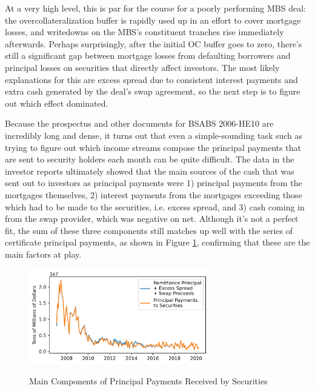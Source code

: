 \documentclass[12pt]{article}
\begin{document}
At a very high level, this is par for the course for a poorly performing MBS deal: the overcollateralization buffer is rapidly used up in an effort to cover mortgage losses, and writedowns on the MBS’s constituent tranches rise immediately afterwards. Perhaps surprisingly, after the initial OC buffer goes to zero, there’s still a significant gap between mortgage losses from defaulting borrowers and principal losses on securities that directly affect investors. The most likely explanations for this are excess spread due to consistent interest payments and extra cash generated by the deal’s swap agreement, so the next step is to figure out which effect dominated.

	Because the prospectus and other documents for BSABS 2006-HE10 are incredibly long and dense, it turns out that even a simple-sounding task such as trying to figure out which income streams compose the principal payments that are sent to security holders each month can be quite difficult. The data in the investor reports ultimately showed that the main sources of the cash that was sent out to investors as principal payments were 1) principal payments from the mortgages themselves, 2) interest payments from the mortgages exceeding those which had to be made to the securities, i.e. excess spread, and 3) cash coming in from the swap provider, which was negative on net. Although it’s not a perfect fit, the sum of these three components still matches up well with the series of certificate principal payments, as shown in Figure \ref{fig:timeseries_security_principal_pmts_composition}, confirming that these are the main factors at play.

\begin{figure}[h]
	\centering
	\caption{Main Components of Principal Payments Received by Securities}
	\includegraphics[width=0.7\textwidth]{../figures/timeseries_security_principal_pmts_composition}
	\label{fig:timeseries_security_principal_pmts_composition}
\end{figure}
\end{document}
